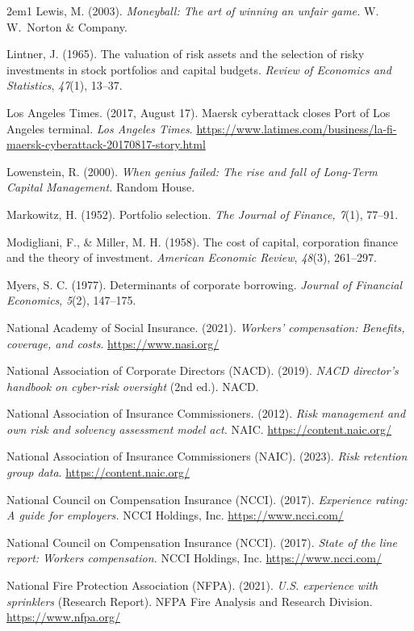\begin{hangparas}{2em}{1}
Lewis, M. (2003). \emph{Moneyball: The art of winning an unfair game.}
W.\,W.\ Norton \& Company.

Lintner, J. (1965). The valuation of risk assets and the selection of risky
investments in stock portfolios and capital budgets. \emph{Review of
Economics and Statistics}, \emph{47}(1), 13--37.

Los Angeles Times. (2017, August 17). Maersk cyberattack closes Port of Los
Angeles terminal. \emph{Los Angeles Times}.
\url{https://www.latimes.com/business/la-fi-maersk-cyberattack-20170817-story.html}

Lowenstein, R. (2000). \emph{When genius failed: The rise and fall of
Long-Term Capital Management.} Random House.

Markowitz, H. (1952). Portfolio selection. \emph{The Journal of Finance,
7}(1), 77--91.

Modigliani, F., \& Miller, M. H. (1958). The cost of capital, corporation
finance and the theory of investment. \emph{American Economic Review},
\emph{48}(3), 261--297.

Myers, S. C. (1977). Determinants of corporate borrowing. \emph{Journal of
Financial Economics}, \emph{5}(2), 147--175.

National Academy of Social Insurance. (2021). \emph{Workers' compensation:
Benefits, coverage, and costs}. \url{https://www.nasi.org/}

National Association of Corporate Directors (NACD). (2019). \emph{NACD
director's handbook on cyber-risk oversight} (2nd ed.). NACD.

National Association of Insurance Commissioners. (2012). \emph{Risk
management and own risk and solvency assessment model act.} NAIC.
\url{https://content.naic.org/}

National Association of Insurance Commissioners (NAIC). (2023). \emph{Risk
retention group data}. \url{https://content.naic.org/}

National Council on Compensation Insurance (NCCI). (2017). \emph{Experience
rating: A guide for employers.} NCCI Holdings, Inc.
\url{https://www.ncci.com/}

National Council on Compensation Insurance (NCCI). (2017). \emph{State of the
line report: Workers compensation.} NCCI Holdings, Inc.
\url{https://www.ncci.com/}

National Fire Protection Association (NFPA). (2021). \emph{U.S. experience
with sprinklers} (Research Report). NFPA Fire Analysis and Research Division.
\url{https://www.nfpa.org/}


\end{hangparas}

